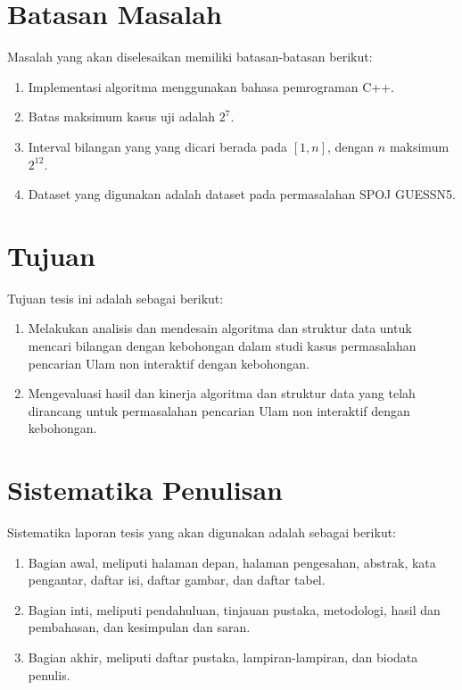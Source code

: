 \section {Batasan Masalah}
Masalah yang akan diselesaikan memiliki batasan-batasan berikut:

\begin {enumerate}
  \item Implementasi algoritma menggunakan bahasa pemrograman C++.
  \item Batas maksimum kasus uji adalah $2^7$.
  \item Interval bilangan yang yang dicari berada pada $[1,n]$, dengan $n$ maksimum $2^{12}$.
  \item Dataset yang digunakan adalah dataset pada permasalahan SPOJ GUESSN5.
\end {enumerate}

\section {Tujuan}
Tujuan tesis ini adalah sebagai berikut:

\begin{enumerate}
  \item Melakukan analisis dan mendesain algoritma dan struktur data untuk mencari bilangan dengan kebohongan dalam studi kasus permasalahan pencarian Ulam non interaktif dengan kebohongan.
  \item Mengevaluasi hasil dan kinerja algoritma dan struktur data yang telah dirancang untuk permasalahan pencarian Ulam non interaktif dengan kebohongan.
\end{enumerate}

\section {Sistematika Penulisan}
Sistematika laporan tesis yang akan digunakan adalah sebagai berikut:

\begin{enumerate}
\item Bagian awal, meliputi halaman depan, halaman pengesahan, abstrak, kata pengantar, daftar isi, daftar gambar, dan daftar tabel.
\item Bagian inti, meliputi pendahuluan, tinjauan pustaka, metodologi, hasil dan pembahasan, dan kesimpulan dan saran.
\item Bagian akhir, meliputi daftar pustaka, lampiran-lampiran, dan biodata penulis.
\end{enumerate}